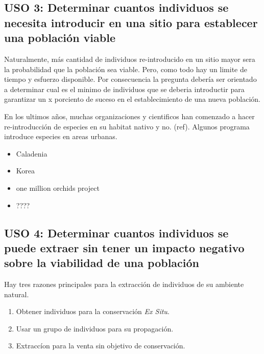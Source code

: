 \documentclass[
]{book}
\providecommand{\tightlist}{%
  \setlength{\itemsep}{0pt}\setlength{\parskip}{0pt}}
\theoremstyle{definition}
\theoremstyle{definition}
\theoremstyle{definition}
\theoremstyle{definition}
\theoremstyle{remark}
\begin{document}
\hypertarget{uso-3-determinar-cuantos-individuos-se-necesita-introducir-en-una-sitio-para-establecer-una-poblaciuxf3n-viable}{%
\subsection{USO 3: Determinar cuantos individuos se necesita introducir en una sitio para establecer una población viable}\label{uso-3-determinar-cuantos-individuos-se-necesita-introducir-en-una-sitio-para-establecer-una-poblaciuxf3n-viable}}

Naturalmente, más cantidad de individuos re-introducido en un sitio mayor sera la probabilidad que la población sea viable. Pero, como todo hay un limite de tiempo y esfuerzo disponible. Por consecuencia la pregunta debería ser orientado a determinar cual es el minimo de individuos que se deberia introductir para garantizar un x porciento de suceso en el establecimiento de una nueva población.

En los ultimos años, muchas organizaciones y cientificos han comenzado a hacer re-introducción de especies en su habitat nativo y no. (ref). Algunos programa introduce especies en areas urbanas.

\begin{itemize}
\tightlist
\item
  Caladenia
\item
  Korea
\item
  one million orchids project
\item
  ????
\end{itemize}

\hypertarget{uso-4-determinar-cuantos-individuos-se-puede-extraer-sin-tener-un-impacto-negativo-sobre-la-viabilidad-de-una-poblaciuxf3n}{%
\subsection{USO 4: Determinar cuantos individuos se puede extraer sin tener un impacto negativo sobre la viabilidad de una población}\label{uso-4-determinar-cuantos-individuos-se-puede-extraer-sin-tener-un-impacto-negativo-sobre-la-viabilidad-de-una-poblaciuxf3n}}

Hay tres razones principales para la extracción de individuos de su ambiente natural.

\begin{enumerate}
\def\labelenumi{\arabic{enumi}.}
\tightlist
\item
  Obtener individuos para la conservación \emph{Ex Situ}.
\item
  Usar un grupo de individuos para su propagación.
\item
  Extraccíon para la venta sin objetivo de conservación.
\end{enumerate}
\end{document}
